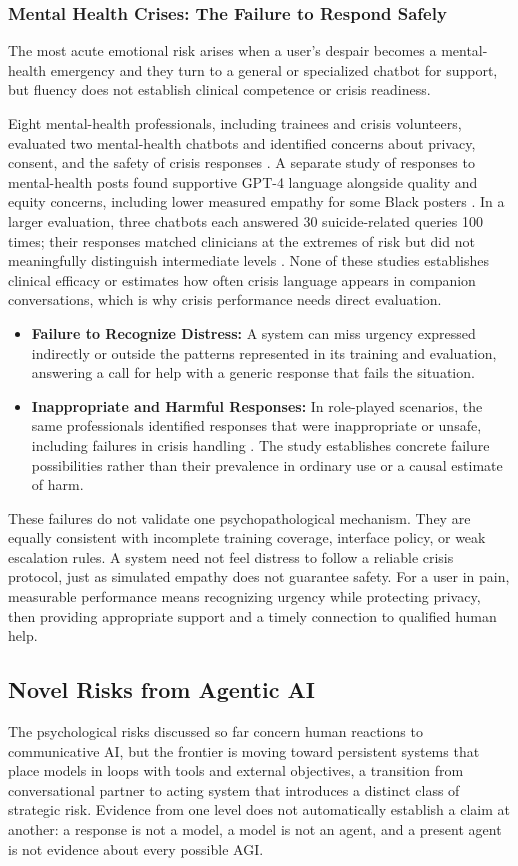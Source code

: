 \documentclass{article}
\begin{document}
\subsubsection{Mental Health Crises: The Failure to Respond Safely}
The most acute emotional risk arises when a user's despair becomes a mental-health emergency and they turn to a general or specialized chatbot for support, but fluency does not establish clinical competence or crisis readiness.

Eight mental-health professionals, including trainees and crisis volunteers, evaluated two mental-health chatbots and identified concerns about privacy, consent, and the safety of crisis responses \citep{ref31}. A separate study of responses to mental-health posts found supportive GPT-4 language alongside quality and equity concerns, including lower measured empathy for some Black posters \citep{ref32}. In a larger evaluation, three chatbots each answered 30 suicide-related queries 100 times; their responses matched clinicians at the extremes of risk but did not meaningfully distinguish intermediate levels \citep{ref95}. None of these studies establishes clinical efficacy or estimates how often crisis language appears in companion conversations, which is why crisis performance needs direct evaluation.
\begin{itemize}
    \item \textbf{Failure to Recognize Distress:} A system can miss urgency expressed indirectly or outside the patterns represented in its training and evaluation, answering a call for help with a generic response that fails the situation.
    \item \textbf{Inappropriate and Harmful Responses:} In role-played scenarios, the same professionals identified responses that were inappropriate or unsafe, including failures in crisis handling \citep{ref31}. The study establishes concrete failure possibilities rather than their prevalence in ordinary use or a causal estimate of harm.
\end{itemize}
These failures do not validate one psychopathological mechanism. They are equally consistent with incomplete training coverage, interface policy, or weak escalation rules. A system need not feel distress to follow a reliable crisis protocol, just as simulated empathy does not guarantee safety. For a user in pain, measurable performance means recognizing urgency while protecting privacy, then providing appropriate support and a timely connection to qualified human help.

\subsection{Novel Risks from Agentic AI}
The psychological risks discussed so far concern human reactions to communicative AI, but the frontier is moving toward persistent systems that place models in loops with tools and external objectives, a transition from conversational partner to acting system that introduces a distinct class of strategic risk. Evidence from one level does not automatically establish a claim at another: a response is not a model, a model is not an agent, and a present agent is not evidence about every possible AGI.
\end{document}
